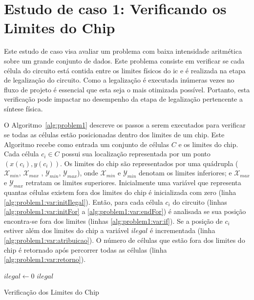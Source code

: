 \section{Estudo de caso 1: Verificando os Limites do Chip}
\label{sec:estudo_de_caso_1}

Este estudo de caso visa avaliar um problema com baixa intensidade aritmética sobre um grande conjunto de dados.
Este problema consiste em verificar se cada célula do circuito está contida entre os limites físicos do \ac{ic} e é realizada na etapa de legalização do circuito.
Como a legalização é executada inúmeras vezes no fluxo de projeto é essencial que esta seja o mais otimizada possível.
Portanto, esta verificação pode impactar no desempenho da etapa de legalização pertencente a síntese física.

O Algoritmo~\ref{alg:problem1} descreve os passos a serem executados para verificar se todas as células estão posicionadas dentro dos limites de um chip.
Este Algoritmo recebe como entrada um conjunto de células $C$ e os limites do chip. 
Cada célula $c_i \in C$ possui sua localização representada por um ponto $(x(c_i), y(c_i))$.
Os limites do chip são representados por uma quádrupla ($\mathcal{X}_{min}$, $\mathcal{X}_{max}$ , $\mathcal{Y}_{min}$, $\mathcal{Y}_{max}$), onde $\mathcal{X}_{min}$ e  $\mathcal{Y}_{min}$ denotam os limites inferiores; e $\mathcal{X}_{max}$ e $\mathcal{Y}_{max}$ retratam os limites superiores.
Inicialmente uma variável que representa quantas células existem fora dos limites do chip é inicializada com zero (linha \ref{alg:problem1:var:initIlegal}).
Então, para cada célula $c_i$ do circuito (linhas \ref{alg:problem1:var:initFor} a \ref{alg:problem1:var:endFor}) é analisada se sua posição encontra-se fora dos limites (linhas \ref{alg:problem1:var:if}).
Se a posição de $c_i$ estiver além dos limites do chip a variável $ilegal$ é incrementada (linha \ref{alg:problem1:var:atribuicao}).
O número de células que estão fora dos limites do chip é retornado após percorrer todas as células (linha \ref{alg:problem1:var:retorno}).


\begin{algorithm}[h!t]
	\LinesNumbered
    $ilegal \gets 0$\; \label{alg:problem1:var:initIlegal}
  	 \label{alg:problem1:var:endFor}
  	\Return $ilegal$\; \label{alg:problem1:var:retorno}
	\caption{Verificação dos Limites do Chip} 
	\label{alg:problem1}
\end{algorithm}

